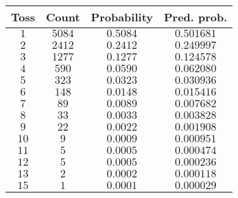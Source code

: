 \begin{tabular}{cccc} \toprule
Toss & Count  & Probability & Pred. prob. \\\midrule
$1$  & $5084$ & $0.5084$    & $0.501681$  \\
$2$  & $2412$ & $0.2412$    & $0.249997$  \\
$3$  & $1277$ & $0.1277$    & $0.124578$  \\
$4$  & $590$  & $0.0590$    & $0.062080$  \\
$5$  & $323$  & $0.0323$    & $0.030936$  \\
$6$  & $148$  & $0.0148$    & $0.015416$  \\
$7$  & $89$   & $0.0089$    & $0.007682$  \\
$8$  & $33$   & $0.0033$    & $0.003828$  \\
$9$  & $22$   & $0.0022$    & $0.001908$  \\
$10$ & $9$    & $0.0009$    & $0.000951$  \\
$11$ & $5$    & $0.0005$    & $0.000474$  \\
$12$ & $5$    & $0.0005$    & $0.000236$  \\
$13$ & $2$    & $0.0002$    & $0.000118$  \\
$15$ & $1$    & $0.0001$    & $0.000029$  \\\bottomrule
\end{tabular}
